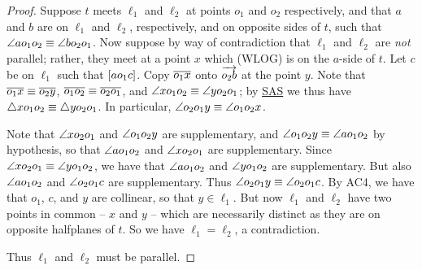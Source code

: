 \begin{proof}
Suppose \(t\) meets \(\ell_1\) and \(\ell_2\) at points \(o_1\) and \(o_2\) respectively, and that \(a\) and \(b\) are on \(\ell_1\) and \(\ell_2\), respectively, and on opposite sides of \(t\), such that \(\angle{ao_1o_2} \equiv \angle{bo_2o_1}\).
Now suppose by way of contradiction that \(\ell_1\) and \(\ell_2\) are \emph{not} parallel; rather, they meet at a point \(x\) which (WLOG) is on the \(a\)-side of \(t\).
Let \(c\) be on \(\ell_1\) such that \([ a o_1 c ]\).
Copy \(\overline{o_1x}\) onto \(\overrightarrow{o_2b}\) at the point \(y\).
Note that \(\overline{o_1x} \equiv \overline{o_2y}\), \(\overline{o_1o_2} \equiv \overline{o_2o_1}\), and \(\angle{xo_1o_2} \equiv \angle{yo_2o_1}\); by \hyperref[prop:sas-theorem]{SAS} we thus have \(\bigtriangleup{xo_1o_2} \equiv \bigtriangleup{yo_2o_1}\).
In particular, \(\angle{o_2o_1y} \equiv \angle{o_1o_2x}\).

\begin{center}
\end{center}

Note that \(\angle{xo_2o_1}\) and \(\angle{o_1o_2y}\) are supplementary, and \(\angle{o_1o_2y} \equiv \angle{ao_1o_2}\) by hypothesis, so that \(\angle{ao_1o_2}\) and \(\angle{xo_2o_1}\) are supplementary.
Since \(\angle{xo_2o_1} \equiv \angle{yo_1o_2}\), we have that \(\angle{ao_1o_2}\) and \(\angle{yo_1o_2}\) are supplementary.
But also \(\angle{ao_1o_2}\) and \(\angle{o_2o_1c}\) are supplementary.
Thus \(\angle{o_2o_1y} \equiv \angle{o_2o_1c}\).
By AC4, we have that \(o_1\), \(c\), and \(y\) are collinear, so that \(y \in \ell_1\).
But now \(\ell_1\) and \(\ell_2\) have two points in common -- \(x\) and \(y\) -- which are necessarily distinct as they are on opposite halfplanes of \(t\).
So we have \(\ell_1 = \ell_2\), a contradiction.

Thus \(\ell_1\) and \(\ell_2\) must be parallel. 
\end{proof}

